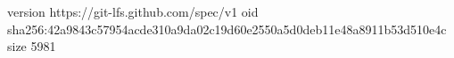 version https://git-lfs.github.com/spec/v1
oid sha256:42a9843c57954acde310a9da02c19d60e2550a5d0deb11e48a8911b53d510e4c
size 5981
